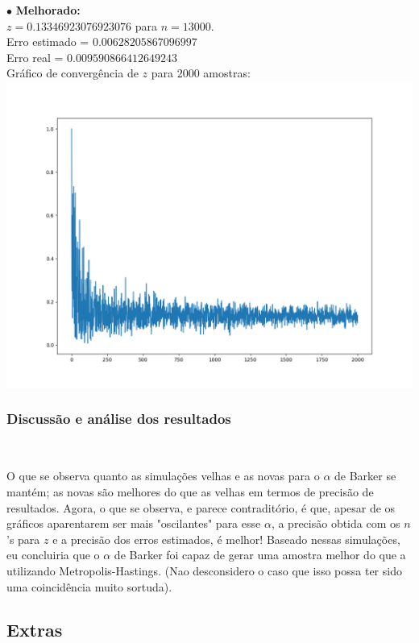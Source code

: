 \documentclass[pt12]{article}
\begin{document}
\indent \indent $\bullet$ \textbf{Melhorado:}\\

\indent \indent $z  = 0.13346923076923076 $ para $n = 13000$.\\
\indent \indent Erro estimado = $0.00628205867096997$\\
\indent \indent Erro real = $0.009590866412649243$\\

\newpage
\indent \indent Gráfico de convergência de $z$ para $2000$ amostras:\\

\includegraphics[scale=0.4]{ConvergZ_B_3.png}

\subsubsection{Discussão e análise dos resultados}
\ 

O que se observa quanto as simulações velhas e as novas para o $\alpha$ de Barker se mantém; as novas são melhores do que as velhas em termos de precisão de resultados.
Agora, o que se observa, e parece contraditório, é que, apesar de os gráficos aparentarem ser mais "oscilantes" para esse $\alpha$, a precisão obtida com os $n$'s para $z$ e a precisão dos erros estimados, é melhor! Baseado nessas simulações, eu concluiria que o $\alpha$ de Barker foi capaz de gerar uma amostra melhor do que a utilizando Metropolis-Hastings. (Nao desconsidero o caso que isso possa ter sido uma coincidência muito sortuda).
\ 

\subsection{Extras}
\ 
\end{document}

